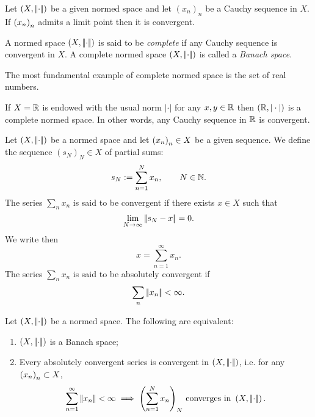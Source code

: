 \documentclass{article}
\begin{document}
\begin{lemma}
	Let $(X,\left|\negthinspace\left|\cdot\right|\negthinspace\right|)$ be a given normed space and let ${(x_{n})}_{n}$ be a Cauchy sequence in $X$. If ${\left({x}_{n}\right)}_{n}$ admits a limit point then it is convergent.
\end{lemma}
\begin{definition}
	A normed space $\left(X,\left|\negthinspace\left|\cdot\right|\negthinspace\right|\right)$ is said to be \emph{complete} if any Cauchy sequence is convergent in $X$. A complete normed space $\left(X,\left|\negthinspace\left|\cdot\right|\negthinspace\right|\right)$ is called a \emph{Banach space}.
\end{definition}
The most fundamental example of complete normed space is the set of real numbers.
\begin{theorem}
	If $X=\mathbb{R}$ is endowed with the usual norm $|\cdot|$ for any $x,y\in\mathbb{R}$ then $(\mathbb{R},|\cdot|)$ is a complete normed space. In other words, any Cauchy sequence in $\mathbb{R}$ is convergent.
\end{theorem}
\begin{definition}
	Let $\left(X,\left|\negthinspace\left|\cdot\right|\negthinspace\right|\right)$ be a normed space and let ${\left({x}_{n}\right)}_{n}\in X$ be a given sequence. We define the sequence ${(s_{N})}_{N}\in X$ of partial sums:
	\begin{equation*}
		s_{N}:=\sum_{n=1}^{N}x_{n},\qquad N\in\mathbb{N}.
	\end{equation*} 
	The series $\sum_{n}x_{n}$ is said to be convergent if there exists $x\in X$ such that
	\begin{equation*}
		\lim_{N\to\infty}\left|\negthinspace\left|s_{N}-x\right|\negthinspace\right|=0.
	\end{equation*}
	We write then 
	\begin{equation*}
		x=\sum_{n=1}^{\infty}x_{n}.
	\end{equation*}
	The series $\sum_{n}x_{n}$ is said to be absolutely convergent if 
	\begin{equation*}
		\sum_{n}\left|\negthinspace\left|x_{n}\right|\negthinspace\right|<\infty.
	\end{equation*}
\end{definition}
\begin{theorem}
	Let $\left(X,\left|\negthinspace\left|\cdot\right|\negthinspace\right|\right)$ be a normed space. The following are equivalent:
	\begin{enumerate}
		\item $\left(X,\left|\negthinspace\left|\cdot\right|\negthinspace\right|\right)$ is a Banach space;
		\item Every absolutely convergent series is convergent in $\left(X,\left|\negthinspace\left|\cdot\right|\negthinspace\right|\right)$, i.e. for any ${\left({x}_{n}\right)}_{n}\subset X$,
		\begin{equation*}
			\sum_{n=1}^{\infty}\left|\negthinspace\left|x_{n}\right|\negthinspace\right|<\infty\implies{\left(\sum_{n=1}^{N}x_{n}\right)}_N\text{ converges in }\left(X,\left|\negthinspace\left|\cdot\right|\negthinspace\right|\right).
		\end{equation*}
	\end{enumerate}
\end{theorem}\label{theo213}
\end{document}
